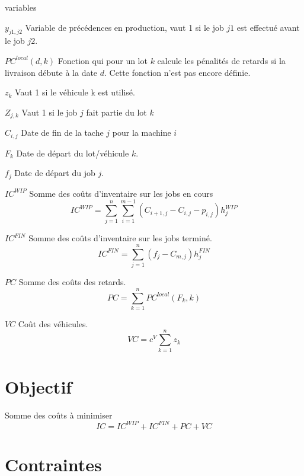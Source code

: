 \documentclass{article}
\begin{document}
        \begin{labeling}{variables}
            \item [$y_{j1,j2}$] Variable de précédences en production, vaut 1 si le job $j1$ est effectué avant le job $j2$. 
            \item [$PC^{local}\left(d,k\right)$] Fonction qui pour un lot $k$ calcule les pénalités de retards si la livraison débute à la date $d$. Cette fonction n’est pas encore définie.
            \item [$z_k$] Vaut 1 si le véhicule k est utilisé.
            \item [$Z_{j,k}$] Vaut 1 si le job $j$ fait partie du lot $k$
            \item [$C_{i,j}$] Date de fin de la tache $j$ pour la machine $i$
            \item [$F_k$] Date de départ du lot/véhicule $k$.
            \item [$f_j$] Date de départ du job $j$.
            \item [$IC^{WIP}$] Somme des coûts d’inventaire sur les jobs en cours
            $$IC^{WIP}=\sum_{j=1}^{n}\sum_{i=1}^{m-1}{\left(C_{i+1,j}-C_{i,j}-p_{i,j}\right)h_j^{WIP}}$$
            
            \item [$IC^{FIN}$] Somme des coûts d’inventaire sur les jobs terminé.
            $${IC}^{FIN}=\sum_{j=1}^{n}{\left(f_j-C_{m,j}\right)h_j^{FIN}}$$
            \item [$PC$] Somme des coûts des retards.
            $$PC=\sum_{k=1}^{n}{PC^{local}\left(F_k, k\right)}$$
            \item[$VC$] Coût des véhicules.
            $$VC=c^V\sum_{k=1}^{n}z_k$$
            
        \end{labeling}
    
    
    \section*{Objectif}
        Somme des coûts à minimiser 
        $$IC=IC^{WIP}+IC^{FIN}+PC+VC$$
        
    
    \section*{Contraintes}
    
\end{document}
